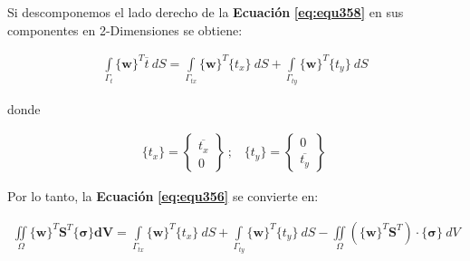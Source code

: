 Si descomponemos el lado derecho de la \textbf{Ecuación} \textbf{\ref{eq:equ358}} en sus componentes en 2-Dimensiones se obtiene:

\begin{ceqn} %
\begin{gather}\label{eq:equ359}
\int \limits_{\Gamma_{t}} \{\mathbf{w}\}^T \overline{t}\ dS = 
\int \limits_{\Gamma_{tx}} \{\mathbf{w}\}^T \{t_x\}\ dS +
\int \limits_{\Gamma_{ty}} \{\mathbf{w}\}^T \{t_y\}\ dS
\end{gather}   
\end{ceqn}

donde 

\begin{ceqn} %
\begin{gather}\label{eq:equ360}
\{t_x\} = \begin{Bmatrix} \overline{t_x} \\ 0 \end{Bmatrix}\ \text{;}\quad
\{t_y\} = \begin{Bmatrix} 0 \\ \overline{t_y} \end{Bmatrix}\
\end{gather}   
\end{ceqn}

Por lo tanto, la \textbf{Ecuación} \textbf{\ref{eq:equ356}} se convierte en:

\begin{ceqn} %
\begin{gather}\label{eq:equ361}
\iint \limits_\Omega \{\mathbf{w}\}^T \mathbf{S}^T\{\mathbf{\sigma}\} \mathbf{dV} = 
\int \limits_{\Gamma_{tx}} \{\mathbf{w}\}^T \{t_x\}\ dS +
\int \limits_{\Gamma_{ty}} \{\mathbf{w}\}^T \{t_y\}\ dS -
\iint \limits_\Omega (\{\mathbf{w}\}^T \mathbf{S}^T) \cdot \{\mathbf{\sigma}\}\ dV
\end{gather}   
\end{ceqn}


